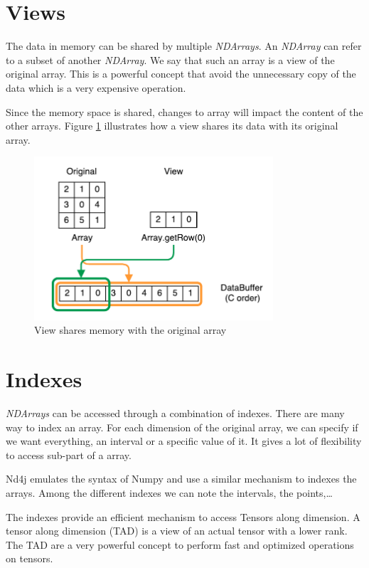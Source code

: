 \section{Views}
\label{sec:viewsDesc}
The data in memory can be shared by multiple \textit{NDArrays}. An \textit{NDArray} can refer to a subset of another \textit{NDArray}. We say that such an array is a view of the original array. This is a powerful concept that avoid the unnecessary copy of the data which is a very expensive operation.

Since the memory space is shared, changes to array will impact the content of the other arrays. Figure \ref{fig:sharememView} illustrates how a view shares its data with its original array.


\begin{figure}[!h]
	\begin{center}
		\includegraphics[width=3.5in]{images/views.pdf} 
		\caption{View shares memory with the original array}		
		\label{fig:sharememView}
	\end{center}
\end{figure}


\section{Indexes}

\textit{NDArrays} can be accessed through a combination of indexes. There are many way to index an array. For each dimension of the original array, we can specify if we want everything, an interval or a specific value of it. It gives a lot of flexibility to access sub-part of a array. 

Nd4j emulates the  syntax of Numpy\cite{numpy} and use a similar mechanism to indexes the arrays. Among the different indexes we can note the intervals, the points,\dots

The indexes provide an efficient mechanism to access Tensors along dimension. A tensor along dimension (TAD) is a view of an actual tensor with a lower rank. The TAD are a very powerful concept to perform fast and optimized operations on tensors.

